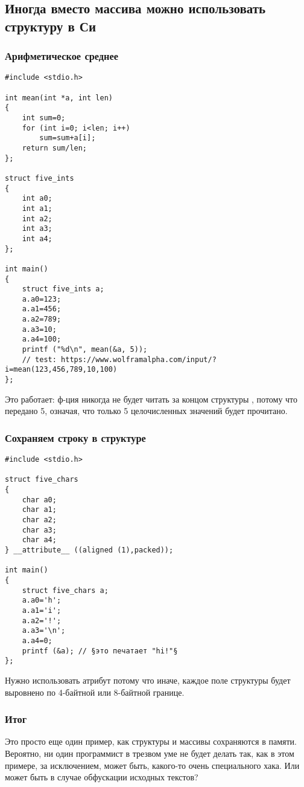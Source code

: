 \subsection{Иногда вместо массива можно использовать структуру в Си}

\subsubsection{Арифметическое среднее}

\begin{lstlisting}[style=customc]
#include <stdio.h>

int mean(int *a, int len)
{
	int sum=0;
	for (int i=0; i<len; i++)
		sum=sum+a[i];
	return sum/len;
};

struct five_ints
{
	int a0;
	int a1;
	int a2;
	int a3;
	int a4;
};

int main()
{
	struct five_ints a;
	a.a0=123;
	a.a1=456;
	a.a2=789;
	a.a3=10;
	a.a4=100;
	printf ("%d\n", mean(&a, 5));
	// test: https://www.wolframalpha.com/input/?i=mean(123,456,789,10,100)
};
\end{lstlisting}

Это работает: ф-ция  никогда не будет читать за концом структуры ,
потому что передано 5, означая, что только 5 целочисленных значений будет прочитано.

\subsubsection{Сохраняем строку в структуре}

\begin{lstlisting}[style=customc]
#include <stdio.h>

struct five_chars
{
	char a0;
	char a1;
	char a2;
	char a3;
	char a4;
} __attribute__ ((aligned (1),packed));

int main()
{
	struct five_chars a;
	a.a0='h';
	a.a1='i';
	a.a2='!';
	a.a3='\n';
	a.a4=0;
	printf (&a); // §это печатает "hi!"§
};
\end{lstlisting}

Нужно использовать атрибут  потому что иначе, каждое поле структуры будет выровнено по 4-байтной
или 8-байтной границе.

\subsubsection{Итог}

Это просто еще один пример, как структуры и массивы сохраняются в памяти.
Вероятно, ни один программист в трезвом уме не будет делать так, как в этом примере, за исключением, может быть, какого-то
очень специального хака.
Или может быть в случае обфускации исходных текстов?

